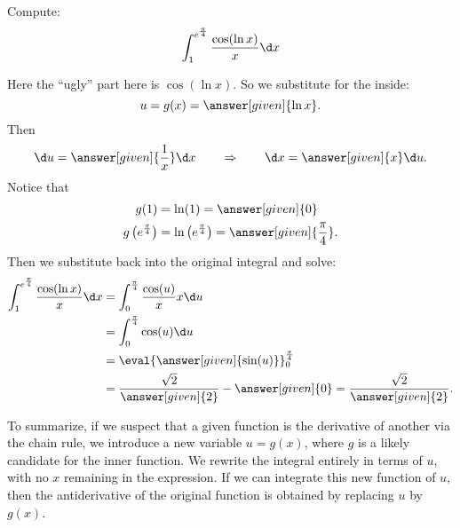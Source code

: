 \documentclass{ximera}
\begin{document}
\begin{example}
  Compute:
  \[
  \int_{1}^{e^{\frac{\pi}{4}}} \frac{\cos(\ln x)}{x} \d x
  \]
\begin{explanation}
Here the ``ugly'' part here is $\cos(\ln x)$.  So we substitute for
the inside:
\[
u=g(x)=\answer[given]{\ln x}.
\]
Then
\[
\d u =  \answer[given]{\frac{1}{x}} \d x 	\qquad	\Rightarrow	\qquad	\d x = \answer[given]{x} \d u.
\]
Notice that
\begin{align*}
g(1) &= \ln (1) = \answer[given]{0} \\
g \left( e^{\frac{\pi}{4}} \right) &= \ln \left( e^{\frac{\pi}{4}} \right) = \answer[given]{\frac{\pi}{4}}.
\end{align*}
Then we substitute back into the original integral and solve:
\begin{align*}
\int_{1}^{e^{\frac{\pi}{4}}} \frac{\cos(\ln x)}{x} \d x &= \int_0^{\frac{\pi}{4}} \frac{\cos(u)}{x} x \d u  \\
&= \int_0^{\frac{\pi}{4}} \cos(u) \d u  \\
&= \eval{\answer[given]{\sin(u)}}_{0}^{\frac{\pi}{4}}  \\
&= \frac{\sqrt{2}}{\answer[given]{2}} - \answer[given]{0} = \frac{\sqrt{2}}{\answer[given]{2}}.
\end{align*}
\end{explanation}
\end{example}

To summarize, if we suspect that a given function is the derivative of
another via the chain rule, we introduce a new variable $u=g(x)$, where $g$ is a likely candidate for
the inner function. We rewrite the integral
 entirely in terms of $u$, with no $x$ remaining in the
expression. If we can integrate this new function of $u$, then the
antiderivative of the original function is obtained by replacing $u$
by $g(x)$.
\end{document}

